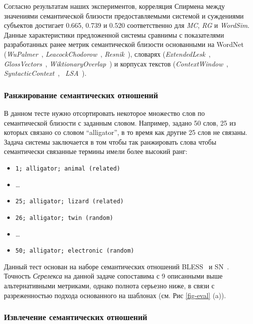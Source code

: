 \documentclass[a4paper,10pt,twoside]{article}
\begin{document}
 Согласно результатам наших экспериментов, корреляция Спирмена между значениями семантической близости предоставляемыми системой и суждениями субъектов достигает 
0.665, 0.739 и 0.520 соответственно для \textit{MC}, \textit{RG} и \textit{WordSim}. Данные характеристики предложенной системы сравнимы с показателями разработанных ранее метрик семантической близости основанными на WordNet (\textit{WuPalmer}~\cite{wu1994verbs}, \textit{LeacockChodorow}~\cite{leacock1998}, \textit{Resnik}~\cite{resnik1995}), словарях (\textit{ExtendedLesk}~\cite{banerjee2003extended}, \textit{GlossVectors}~\cite{patwardhan2006using}, \textit{WiktionaryOverlap}~\cite{zesch2008extracting}) и  корпусах текстов (\textit{ContextWindow}~\cite{cruys2010mining}, \textit{SyntacticContext}~\cite{cruys2010mining}, ~\textit{LSA}~\cite{landauer1998introduction}).

\subsubsection{Ранжирование семантических отношений}

В данном тесте нужно отсортировать некоторое множество слов по семантической близости с заданным словом. Например, задано 50 слов, 25 из которых связано со словом ``alligator'', в то время как другие 25 слов не связаны. Задача системы заключается в том чтобы так ранжировать слова чтобы семантически связанные термины имели более высокий ранг:

\begin{itemize}
\footnotesize
\item \texttt{1; alligator; animal (related)}
\item \ldots
\item \texttt{25; alligator; lizard (related)}
\item \texttt{26; alligator; twin (random)}
\item \ldots
\item \texttt{50; alligator; electronic (random) }
\end{itemize}

Данный тест основан на наборе семантических отношений BLESS~\cite{baroniwe} и SN~\cite{panchenko2012study}. Точность \textit{Серелекса} на данной задаче сопоставима с 9 описанными выше альтернативными метриками, однако полнота серьезно ниже, в связи с разреженностью подхода основанного на шаблонах (см. Рис \ref{fig-eval} (a)).

\subsubsection{Извлечение семантических отношений} 
\end{document}
